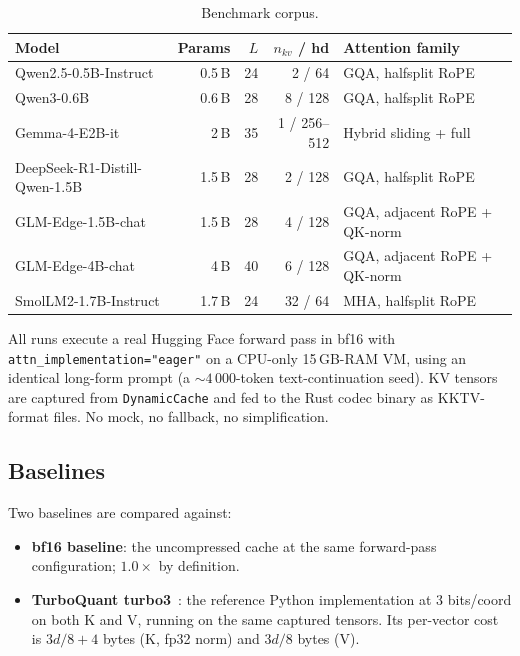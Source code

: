 \documentclass[11pt,a4paper]{article}
\theoremstyle{definition}
\theoremstyle{plain}
\begin{document}
\begin{table}[H]
\centering
\small
\caption{Benchmark corpus.}
\label{tab:models}
\begin{tabular}{lrrrl}
  \toprule
  Model & Params & $L$ & $n_{kv}$ / hd & Attention family \\
  \midrule
  Qwen2.5-0.5B-Instruct  & 0.5\,B & 24 & 2 / 64        & GQA, halfsplit RoPE \\
  Qwen3-0.6B             & 0.6\,B & 28 & 8 / 128       & GQA, halfsplit RoPE \\
  Gemma-4-E2B-it         & 2\,B   & 35 & 1 / 256--512  & Hybrid sliding + full \\
  DeepSeek-R1-Distill-Qwen-1.5B & 1.5\,B & 28 & 2 / 128 & GQA, halfsplit RoPE \\
  GLM-Edge-1.5B-chat     & 1.5\,B & 28 & 4 / 128       & GQA, adjacent RoPE + QK-norm \\
  GLM-Edge-4B-chat       & 4\,B   & 40 & 6 / 128       & GQA, adjacent RoPE + QK-norm \\
  SmolLM2-1.7B-Instruct  & 1.7\,B & 24 & 32 / 64       & MHA, halfsplit RoPE \\
  \bottomrule
\end{tabular}
\end{table}

All runs execute a real Hugging Face forward pass in bf16 with \verb|attn_implementation="eager"| on a CPU-only 15\,GB-RAM VM, using an identical long-form prompt (a $\sim 4\,000$-token text-continuation seed). KV tensors are captured from \verb|DynamicCache| and fed to the Rust codec binary as KKTV-format files. No mock, no fallback, no simplification.

\subsection{Baselines}
Two baselines are compared against:
\begin{itemize}[leftmargin=*]
  \item \textbf{bf16 baseline}: the uncompressed cache at the same forward-pass configuration; $1.0\times$ by definition.
  \item \textbf{TurboQuant turbo3}~\cite{turboquant}: the reference Python implementation at 3 bits/coord on both K and V, running on the same captured tensors. Its per-vector cost is $3d/8 + 4$ bytes (K, fp32 norm) and $3d/8$ bytes (V).
\end{itemize}
\end{document}
